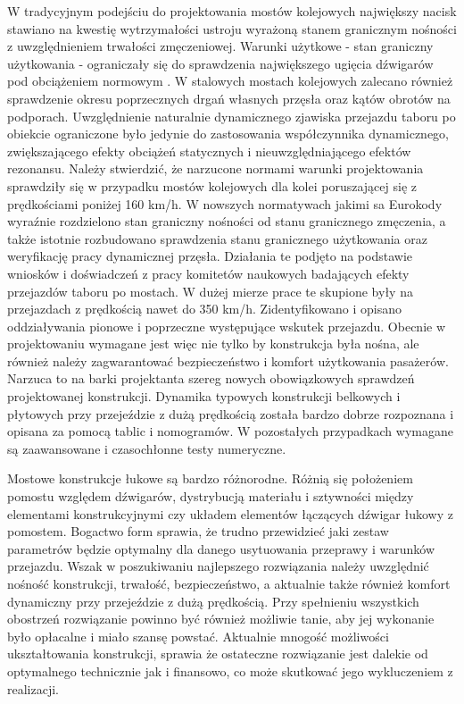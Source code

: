 W tradycyjnym podejściu do projektowania mostów kolejowych największy nacisk stawiano na kwestię wytrzymałości ustroju wyrażoną stanem granicznym nośności z uwzględnieniem trwałości zmęczeniowej. Warunki użytkowe - stan graniczny użytkowania - ograniczały się do sprawdzenia największego ugięcia dźwigarów pod obciążeniem normowym \parencite{PKNf}. W stalowych mostach kolejowych zalecano również sprawdzenie okresu poprzecznych drgań własnych przęsła oraz kątów obrotów na podporach. Uwzględnienie naturalnie dynamicznego zjawiska przejazdu taboru po obiekcie ograniczone było jedynie do zastosowania współczynnika dynamicznego, zwiększającego efekty obciążeń statycznych i nieuwzględniającego efektów rezonansu. Należy stwierdzić, że narzucone normami warunki projektowania sprawdziły się w przypadku mostów kolejowych dla kolei poruszającej się z prędkościami poniżej 160 km/h. W nowszych normatywach jakimi sa Eurokody wyraźnie rozdzielono stan graniczny nośności od stanu granicznego zmęczenia, a także istotnie rozbudowano sprawdzenia stanu granicznego użytkowania oraz weryfikację pracy dynamicznej przęsła. Działania te podjęto na podstawie wniosków i doświadczeń z pracy komitetów naukowych badających efekty przejazdów taboru po mostach. W dużej mierze prace te skupione były na przejazdach z prędkością nawet do 350 km/h. Zidentyfikowano i opisano oddziaływania pionowe i poprzeczne występujące wskutek przejazdu. Obecnie w projektowaniu wymagane jest więc nie tylko by konstrukcja była nośna, ale również należy zagwarantować bezpieczeństwo i komfort użytkowania pasażerów. Narzuca to na barki projektanta szereg nowych obowiązkowych sprawdzeń projektowanej konstrukcji. Dynamika typowych konstrukcji belkowych i płytowych przy przejeździe z dużą prędkością została bardzo dobrze rozpoznana i opisana za pomocą tablic i nomogramów. W pozostałych przypadkach wymagane są zaawansowane i czasochłonne testy numeryczne. 

Mostowe konstrukcje łukowe są bardzo różnorodne. Różnią się położeniem pomostu względem dźwigarów, dystrybucją materiału i sztywności między elementami konstrukcyjnymi czy układem elementów łączących dźwigar łukowy z pomostem. Bogactwo form sprawia, że trudno przewidzieć jaki zestaw parametrów będzie optymalny dla danego usytuowania przeprawy i warunków przejazdu. Wszak w poszukiwaniu najlepszego rozwiązania należy uwzględnić nośność konstrukcji, trwałość, bezpieczeństwo, a aktualnie także również komfort dynamiczny przy przejeździe z dużą prędkością. Przy spełnieniu wszystkich obostrzeń rozwiązanie powinno być również możliwie tanie, aby jej wykonanie było opłacalne i miało szansę powstać. Aktualnie mnogość możliwości ukształtowania konstrukcji, sprawia że ostateczne rozwiązanie jest dalekie od optymalnego technicznie jak i finansowo, co może skutkować jego wykluczeniem z realizacji.


